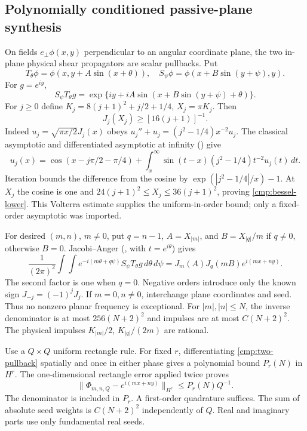 \documentclass[11pt,a4paper]{amsart}
\theoremstyle{definition}
\theoremstyle{remark}
\numberwithin{equation}{section}
\begin{document}
\subsection{Polynomially conditioned passive-plane synthesis}
\label{cmp:bessel}

On fields $e_\perp\phi(x,y)$ perpendicular to an angular coordinate plane,
the two in-plane physical shear propagators are scalar pullbacks. Put
\[
 T_\theta\phi=\phi(x,y+A\sin(x+\theta)),\quad
 S_\psi\phi=\phi(x+B\sin(y+\psi),y).
\]
For $g=e^{iy}$,
\begin{equation}
 S_\psi T_\theta g
 =\exp\{iy+iA\sin(x+B\sin(y+\psi)+\theta)\}.
 \label{cmp:two-pullback}
\end{equation}
For $j\ge0$ define $K_j=8(j+1)^2+j/2+1/4$, $X_j=\pi K_j$. Then
\begin{equation}
 J_j(X_j)\ge[16(j+1)]^{-1}.\label{cmp:bessel-lower}
\end{equation}
Indeed $u_j=\sqrt{\pi x/2}J_j(x)$ obeys
$u_j''+u_j=(j^2-1/4)x^{-2}u_j$. The classical asymptotic and differentiated
asymptotic at infinity (\cite[10.17.3 and 10.17.9]{DLMF}) give
\[
 u_j(x)=\cos(x-j\pi/2-\pi/4)+
 \int_x^\infty\sin(t-x)(j^2-1/4)t^{-2}u_j(t)\,dt.
\]
Iteration bounds the difference from the cosine by
$\exp(|j^2-1/4|/x)-1$. At $X_j$ the cosine is one and
$24(j+1)^2\le X_j\le36(j+1)^2$, proving \eqref{cmp:bessel-lower}.
This Volterra estimate supplies the uniform-in-order bound; only a
fixed-order asymptotic was imported.

For desired $(m,n)$, $m\ne0$, put $q=n-1$, $A=X_{|m|}$, and
$B=X_{|q|}/m$ if $q\ne0$, otherwise $B=0$. Jacobi--Anger
(\cite[10.12.1]{DLMF}, with $t=e^{i\theta}$) gives
\begin{equation}
 \frac1{(2\pi)^2}\int\!\int e^{-i(m\theta+q\psi)}
 S_\psi T_\theta g\,d\theta\,d\psi
 =J_m(A)J_q(mB)e^{i(mx+ny)}.\label{cmp:phase-extraction}
\end{equation}
The second factor is one when $q=0$. Negative orders introduce only the
known sign $J_{-j}=(-1)^jJ_j$. If $m=0,n\ne0$, interchange plane
coordinates and seed. Thus no nonzero planar frequency is exceptional.
For $|m|,|n|\le N$, the inverse denominator is at most $256(N+2)^2$ and
impulses are at most $C(N+2)^2$. The physical impulses
$K_{|m|}/2$, $K_{|q|}/(2m)$ are rational.

Use a $Q\times Q$ uniform rectangle rule. For fixed $r$, differentiating
\eqref{cmp:two-pullback} spatially and once in either phase gives a
polynomial bound $P_r(N)$ in $H^r$. The one-dimensional rectangle error
applied twice proves
\[
 \|\Phi_{m,n,Q}-e^{i(mx+ny)}\|_{H^r}\le P_r(N)Q^{-1}.
\]
The denominator is included in $P_r$. A first-order quadrature suffices.
The sum of absolute seed weights is $C(N+2)^2$ independently of $Q$.
Real and imaginary parts use only fundamental real seeds.
\end{document}
